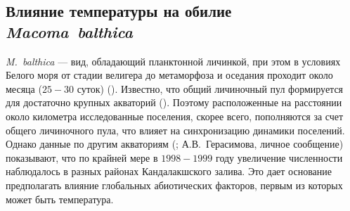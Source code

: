 \subsection{Влияние температуры на обилие \textit{Macoma~balthica}}
\textit{M.~balthica} --- вид, обладающий планктонной личинкой, при этом в условиях Белого моря от стадии велигера до метаморфоза и оседания проходит около месяца ($25 - 30$ суток) (\cite{Flyachinskaya_1999}). 
Известно, что общий личиночный пул формируется для достаточно крупных акваторий (\cite{Maximovich_Shilin_2012}). 
Поэтому расположенные на расстоянии около километра исследованные поселения, скорее всего, пополняются за счет общего личиночного пула, что влияет на синхронизацию динамики поселений. 
Однако данные по другим акваториям (\cite{Varfolomeeva_Naumov_2013}; А.В.~Герасимова, личное сообщение) показывают, что по крайней мере в $1998 - 1999$ году увеличение численности наблюдалось в разных районах Кандалакшского залива. 
Это дает основание предполагать влияние глобальных абиотических факторов, первым из которых может быть температура. 

